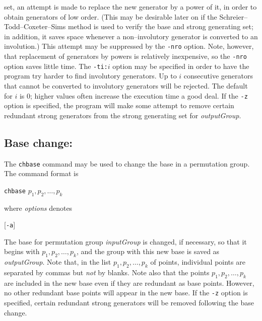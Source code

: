 set, an attempt is made to replace the new generator by a power of it, in
order to obtain generators of low order.  (This may be desirable later on if the 
Schreier--Todd--Coxeter--Sims method is used to verify the base and strong
generating set; in addition, it saves space whenever a non--involutory
generator is converted to an involution.)    This attempt may be suppressed
by the {\tt -nro} option.  Note, however, that replacement of generators
by powers is relatively inexpensive, so the {\tt -nro} option saves little time.
The {\tt -ti:}$i$ option may be specified in order to have the program
try harder to find involutory generators.  Up to $i$ consecutive generators that
cannot be converted to involutory generators will be rejected.  The default
for $i$ is 0; higher values often increase the execution time a good
deal.
\medbreak
If the {\tt -z} option is specified, the program will make some attempt
to remove certain redundant strong generators from the strong generating set for
{\it outputGroup}. 
%
\subsection{Base change:}The {\tt chbase}
command may be used to change the base in a permutation group.  The
command format is
%
\smallskip
\centerline{{\tt chbase}\quad 
                         $p_1,p_2,\ldots,p_k$}
\smallskip
where {\it options\/} denotes
\smallskip
\centerline{
        [{\tt -a}]\enskip
        [{\tt -i}]\enskip
        [{\tt -mb:}$k$]\enskip
        [{\tt -mw:}$w$]\enskip
        [{\tt -n:}{\it name\/}]\enskip
        [{\tt -p:}{\it path\/}]\enskip
        [{\tt -q}]\enskip
        [{\tt -z}]}
\smallskip
The base for permutation group {\it inputGroup\/} is
changed, if necessary, so that it begins  with $p_1,p_2,\ldots,p_k$,
and the group with this new base is saved as {\it outputGroup}.  Note
that, in the list $p_1,p_2,\ldots,p_k$ of points, individual points
are separated by commas but {\it not\/} by blanks.  Note also that the
points $p_1,p_2,\ldots,p_k$ are included in the new base even if
they are redundant as base points.  However, no other redundant base points
will appear in the new base.  If the {\tt -z} option is specified, certain
redundant strong generators will be removed following the base change.
%
%
